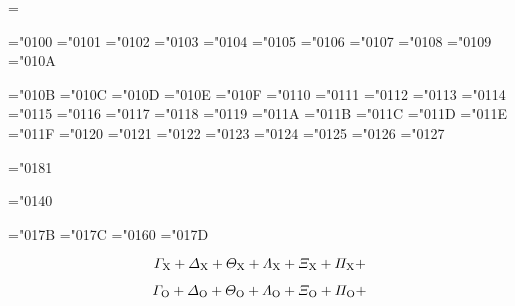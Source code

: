 
\mag=
\hoffset=-1.95in
\voffset=-0.35in


\nopagenumbers




\mathchardef\varGamma="0100
\mathchardef\varDelta="0101
\mathchardef\varTheta="0102
\mathchardef\varLambda="0103
\mathchardef\varXi="0104
\mathchardef\varPi="0105
\mathchardef\varSigma="0106
\mathchardef\varUpsilon="0107
\mathchardef\varPhi="0108
\mathchardef\varPsi="0109
\mathchardef\varOmega="010A

\mathchardef\alpha="010B
\mathchardef\beta="010C
\mathchardef\gamma="010D
\mathchardef\delta="010E
\mathchardef\epsilon="010F
\mathchardef\zeta="0110
\mathchardef\eta="0111
\mathchardef\theta="0112
\mathchardef\iota="0113
\mathchardef\kappa="0114
\mathchardef\lambda="0115
\mathchardef\mu="0116
\mathchardef\nu="0117
\mathchardef\xi="0118
\mathchardef\pi="0119
\mathchardef\rho="011A
\mathchardef\sigma="011B
\mathchardef\tau="011C
\mathchardef\upsilon="011D
\mathchardef\phi="011E
\mathchardef\chi="011F
\mathchardef\psi="0120
\mathchardef\omega="0121
\mathchardef\varepsilon="0122
\mathchardef\vartheta="0123
\mathchardef\varpi="0124
\mathchardef\varrho="0125
\mathchardef\varsigma="0126
\mathchardef\varphi="0127

\mathchardef\omicron="0181

\mathchardef\partial="0140

\mathchardef\imath="017B
\mathchardef\jmath="017C
\mathchardef\ell="0160
\mathchardef\wp="017D


$$
\varGamma_{\rm X}+
\varDelta_{\rm X}+
\varTheta_{\rm X}+
\varLambda_{\rm X}+
\varXi_{\rm X}+
\varPi_{\rm X}+
$$

$$
\varGamma_{\rm O}+
\varDelta_{\rm O}+
\varTheta_{\rm O}+
\varLambda_{\rm O}+
\varXi_{\rm O}+
\varPi_{\rm O}+
$$

